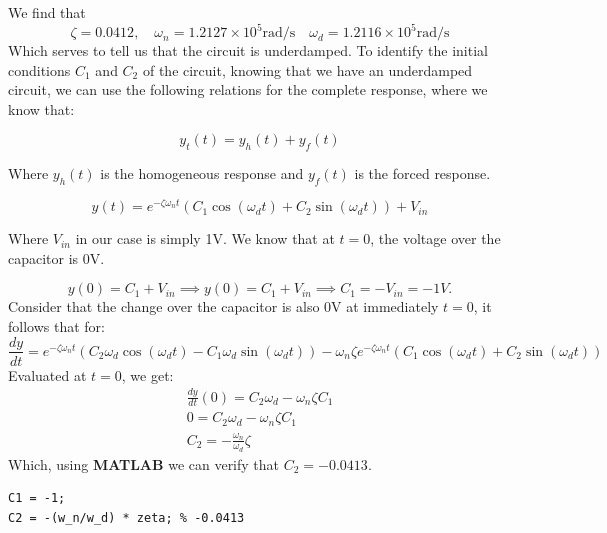 We find that
\begin{equation}
    \zeta = 0.0412, \quad \omega_n = 1.2127\times10^5 \text{rad/s} \quad \omega_d = 1.2116\times10^5 \text{rad/s}
\end{equation}
Which serves to tell us that the circuit is underdamped.
To identify the initial conditions $C_1$ and $C_2$ of the circuit, knowing that we have an underdamped circuit, we can use the following relations for the complete response, where we know that:

\begin{equation}
    y_t(t) = y_h(t) + y_f(t)
\end{equation}

Where $y_h(t)$ is the homogeneous response and $y_f(t)$ is the forced response.

\begin{equation}
    y(t) = e^{-\zeta \omega_n t}\left(C_1\cos(\omega_d t) + C_2\sin(\omega_d t)\right) + V_{in}
\end{equation}

Where $V_{in}$ in our case is simply 1V. We know that at $t=0$, the voltage over the capacitor is 0V.

\begin{equation}
    y(0) = C_1 + V_{in} \implies y(0) = C_1 + V_{in} \implies C_1 = -V_{in} = -1V.
\end{equation}
Consider that the change over the capacitor is also 0V at immediately $t=0$,
it follows that for:
\begin{equation}
    \frac{dy}{dt} = e^{-\zeta \omega_n t} \left(C_2 \omega_d \cos(\omega_d t) - C_1 \omega_d \sin(\omega_d t)\right) - \omega_n \zeta e^{-\zeta \omega_n t} \left(C_1\cos(\omega_d t) + C_2\sin(\omega_d t)\right)
\end{equation}
Evaluated at $t=0$, we get:
\begin{equation}
    \begin{gathered}
        \frac{dy}{dt}(0) = C_2 \omega_d - \omega_n \zeta C_1 \\
        0 = C_2 \omega_d - \omega_n \zeta C_1 \\
        C_2 = - \frac{\omega_n}{\omega_d} \zeta
    \end{gathered}
\end{equation}
Which, using {\bf MATLAB} we can verify that $C_2 = -0.0413$.
\begin{verbatim}
C1 = -1;
C2 = -(w_n/w_d) * zeta; % -0.0413    
\end{verbatim}

